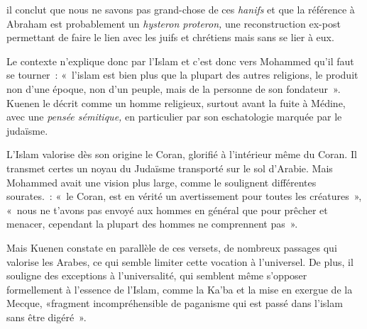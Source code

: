 il conclut que nous ne savons pas grand-chose de ces \emph{hanifs} et
que la référence à Abraham est probablement un \emph{hysteron proteron,}
une reconstruction ex-post permettant de faire le lien avec les juifs et
chrétiens mais sans se lier à eux.

Le contexte n'explique donc par l'Islam et c'est donc vers Mohammed
qu'il faut se tourner~: «~l'islam est bien plus que la plupart des
autres religions, le produit non d'une époque, non d'un peuple, mais de
la personne de son fondateur~». Kuenen le décrit
comme un homme religieux, surtout avant la fuite à Médine, avec une
\emph{pensée sémitique,} en particulier par son eschatologie marquée par
le judaïsme.

L'Islam valorise dès son origine le Coran, glorifié à l'intérieur même
du Coran. Il transmet certes un noyau du Judaïsme transporté sur le sol
d'Arabie. Mais Mohammed avait une vision plus large, comme le soulignent
différentes sourates.~: «~le Coran, est en vérité un avertissement pour
toutes les créatures~», «~nous ne t'avons pas
envoyé aux hommes en général que pour prêcher et menacer, cependant la
plupart des hommes ne comprennent pas~».~

Mais Kuenen constate en parallèle de ces versets, de nombreux passages
qui valorise les Arabes, ce qui semble limiter cette vocation à
l'universel. De plus, il souligne
des exceptions à l'universalité, qui semblent même s'opposer
formellement à l'essence de l'Islam, comme la Ka'ba et la mise en
exergue de la Mecque, «fragment incompréhensible de paganisme qui est
passé dans l'islam sans être digéré~».

